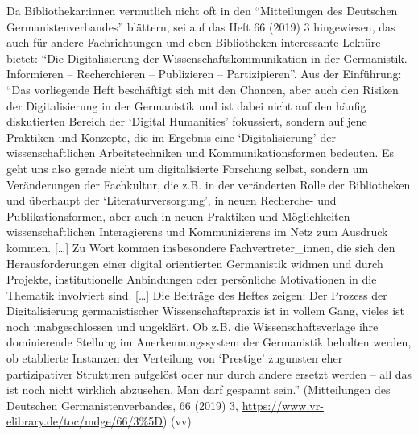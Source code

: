 \documentclass[a4paper,
fontsize=11pt,
oneside,
numbers=noperiodatend,
parskip=half-,
bibliography=totoc,
final
]{scrartcl}
\begin{document}
Da Bibliothekar:innen vermutlich nicht oft in den \enquote{Mitteilungen
des Deutschen Germanistenverbandes} blättern, sei auf das Heft 66 (2019)
3 hingewiesen, das auch für andere Fachrichtungen und eben Bibliotheken
interessante Lektüre bietet: \enquote{Die Digitalisierung der
Wissenschaftskommunikation in der Germanistik. Informieren --
Recherchieren -- Publizieren -- Partizipieren}. Aus der Einführung:
\enquote{Das vorliegende Heft beschäftigt sich mit den Chancen, aber
auch den Risiken der Digitalisierung in der Germanistik und ist dabei
nicht auf den häufig diskutierten Bereich der \enquote{Digital
Humanities} fokussiert, sondern auf jene Praktiken und Konzepte, die im
Ergebnis eine \enquote{Digitalisierung} der wissenschaftlichen
Arbeitstechniken und Kommunikationsformen bedeuten. Es geht uns also
gerade nicht um digitalisierte Forschung selbst, sondern um
Veränderungen der Fachkultur, die z.B. in der veränderten Rolle der
Bibliotheken und überhaupt der \enquote{Literaturversorgung}, in neuen
Recherche- und Publikationsformen, aber auch in neuen Praktiken und
Möglichkeiten wissenschaftlichen Interagierens und Kommunizierens im
Netz zum Ausdruck kommen. {[}\ldots{]} Zu Wort kommen insbesondere
Fachvertreter\_innen, die sich den Herausforderungen einer digital
orientierten Germanistik widmen und durch Projekte, institutionelle
Anbindungen oder persönliche Motivationen in die Thematik involviert
sind. {[}\ldots{]} Die Beiträge des Heftes zeigen: Der Prozess der
Digitalisierung germanistischer Wissenschaftspraxis ist in vollem Gang,
vieles ist noch unabgeschlossen und ungeklärt. Ob z.B. die
Wissenschaftsverlage ihre dominierende Stellung im Anerkennungssystem
der Germanistik behalten werden, ob etablierte Instanzen der Verteilung
von \enquote{Prestige} zugunsten eher partizipativer Strukturen
aufgelöst oder nur durch andere ersetzt werden -- all das ist noch nicht
wirklich abzusehen. Man darf gespannt sein.} (Mitteilungen des Deutschen
Germanistenverbandes, 66 (2019) 3,
\url{https://www.vr-elibrary.de/toc/mdge/66/3\%5D}) (vv)
\end{document}
